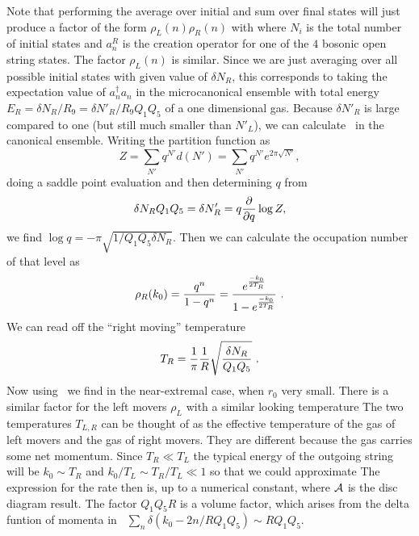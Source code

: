 Note that performing the average over initial and sum over final states
will just produce a factor of the form $ \rho_L(n) \rho_R (n)$ with
\eqn{}
where $N_i$ is the total number of initial states and
$ a_n^R $ is the creation operator for one of the $ 4  $
bosonic open
string states. The factor $ \rho_L(n) $ is similar.
Since we are  just
averaging
 over all possible initial states with given value of $\delta N_R$,
this corresponds to taking the expectation value of $a^\dagger_n a_n$ in
the microcanonical ensemble with total energy $E_R = \delta N_R/R_9 =
\delta N'_R / R_9 Q_1 Q_5 $ 
of a one
dimensional gas. Because  $\delta N'_R  $ is large compared to one (but still
much smaller than $N'_L$), we can calculate \rhoright\ in
the canonical ensemble. Writing the partition function as
$$
Z = \sum_{N'} q^{N'} d(N') = \sum_{N'}  q^{N'} e^{ 2 \pi \sqrt{ N'} },
$$
doing a saddle point evaluation and then determining $q$ from
$$
\delta N_R Q_1 Q_5 = \delta N'_R = q {\partial \over \partial q } \log Z,
$$
we find $ \log q = - \pi \sqrt{1 / Q_1 Q_5 \delta N_R}  $.
Then we can calculate the occupation number of that level as
$$ \rho_R(k_0) = { q^n \over 1-q^n } = { e^{- k_0 \over 2 T_R } \over
1 - e^{ - k_0 \over 2 T_R } }~.
$$
We can read off the ``right moving'' temperature
$$ T_R = {1 \over \pi}   {1 \over R }
 \sqrt{ \delta N_R \over Q_1 Q_5 }~.
$$
Now using \dbranes\ we find 
\eqn{}
in the near-extremal case, when $r_0$ very small. 
There is a similar factor for the left movers $\rho_L$
with a similar looking temperature
\eqn{}
The two temperatures $T_{L,R}$ can be thought of as the
effective temperature of the gas of left movers and the
gas of right movers. They are different because the gas
carries some net momentum. 
Since  $T_R \ll T_L$ the typical energy of the
outgoing string will be $k_0 \sim T_R $ and
$k_0/ T_L \sim T_R/T_L \ll 1 $ so that
we could approximate
\eqn{}
The expression for the rate then is, up to a numerical constant,
\eqn{}
where ${\cal A}$ is the disc diagram result.
 The factor
 $Q_1 Q_5 R$ is a volume factor, which 
arises from the delta funtion of momenta in \rateunpol\
$ \sum_n \delta (k_0 - 2 n/RQ_1Q_5 ) \sim R Q_1 Q_5 $.
